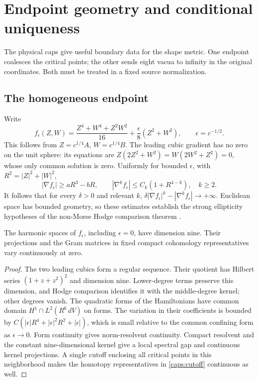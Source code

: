 \section{Endpoint geometry and conditional uniqueness}
\label{sec:endpoints}
The physical caps give useful boundary data for the shape metric.
One endpoint coalesces the critical points; the other sends eight
vacua to infinity in the original coordinates. Both must be treated
in a fixed source normalization.

\subsection{The homogeneous endpoint}
Write
\[
f_\epsilon(Z,W)=\frac{Z^4+W^4+Z^2W^2}{16}
                 +\frac{\epsilon}{8}(Z^2+W^2),
\qquad \epsilon=c^{-1/2}.
\]
This follows from $Z=c^{1/4}A$, $W=c^{1/4}B$. The leading cubic
gradient has no zero on the unit sphere: its equations are
$Z(2Z^2+W^2)=W(2W^2+Z^2)=0$, whose only common solution is zero.
Uniformly for bounded $\epsilon$, with $R^2=|Z|^2+|W|^2$,
\[
|\nabla f_\epsilon|\ge aR^3-bR,\qquad
|\nabla^k f_\epsilon|\le C_k(1+R^{4-k}),\quad k\ge2.
\]
It follows that for every $\delta>0$ and relevant $k$,
$\delta|\nabla f_\epsilon|^k-|\nabla^k f_\epsilon|\to+\infty$.
Euclidean space has bounded geometry, so these estimates establish
the strong ellipticity hypotheses of the non-Morse Hodge
comparison theorem \cite[Theorem 2.34]{LiWen}.

\begin{proposition}\label{end:continuous}
The harmonic spaces of $f_\epsilon$, including $\epsilon=0$, have
dimension nine. Their projections and the Gram matrices in fixed
compact cohomology representatives vary continuously at zero.
\end{proposition}
\begin{proof}
The two leading cubics form a regular sequence. Their quotient has
Hilbert series $(1+z+z^2)^2$ and dimension nine. Lower-degree terms
preserve this dimension, and Hodge comparison identifies it with
the middle-degree kernel; other degrees vanish.
The quadratic forms of the Hamiltonians have common domain
$H^1\cap L^2(R^6\,dV)$ on forms. The variation in their coefficients
is bounded by
$C(|\epsilon|R^4+|\epsilon|^2R^2+|\epsilon|)$, which is small relative
to the common confining form as $\epsilon\to0$. Form continuity
gives norm-resolvent continuity. Compact resolvent and the constant
nine-dimensional kernel give a local spectral gap and continuous
kernel projections. A single cutoff enclosing all critical points
in this neighborhood makes the homotopy representatives in
\eqref{caps:cutoff} continuous as well.
\end{proof}

